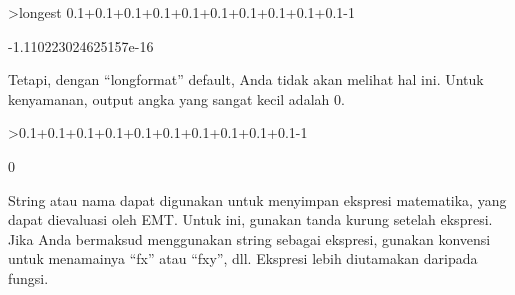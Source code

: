 \documentclass[a4paper,10pt]{article}
\begin{document}
\begin{eulernotebook}
\begin{eulerprompt}
>longest 0.1+0.1+0.1+0.1+0.1+0.1+0.1+0.1+0.1+0.1-1
\end{eulerprompt}
\begin{euleroutput}
   -1.110223024625157e-16 
\end{euleroutput}
\begin{eulercomment}
Tetapi, dengan “longformat” default, Anda tidak akan melihat hal ini.
Untuk kenyamanan, output angka yang sangat kecil adalah 0.
\end{eulercomment}
\begin{eulerprompt}
>0.1+0.1+0.1+0.1+0.1+0.1+0.1+0.1+0.1+0.1-1
\end{eulerprompt}
\begin{euleroutput}
  0
\end{euleroutput}
\begin{eulercomment}
String atau nama dapat digunakan untuk menyimpan ekspresi matematika,
yang dapat dievaluasi oleh EMT. Untuk ini, gunakan tanda kurung
setelah ekspresi. Jika Anda bermaksud menggunakan string sebagai
ekspresi, gunakan konvensi untuk menamainya “fx” atau “fxy”, dll.
Ekspresi lebih diutamakan daripada fungsi.


\end{eulercomment}
\end{eulernotebook}
\end{document}
